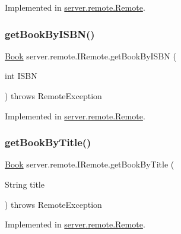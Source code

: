 Implemented in \hyperlink{classserver_1_1remote_1_1_remote_a3d41acc8ab7328be2082573542758f07}{server.\+remote.\+Remote}.

\mbox{\label{interfaceserver_1_1remote_1_1_i_remote_a736183bf7a57f78acf11fb78ae0f0e58}} 
\subsubsection{\texorpdfstring{get\+Book\+By\+I\+S\+B\+N()}{getBookByISBN()}}
{\footnotesize\ttfamily \hyperlink{classserver_1_1data_1_1_book}{Book} server.\+remote.\+I\+Remote.\+get\+Book\+By\+I\+S\+BN (\begin{DoxyParamCaption}\item[{int}]{I\+S\+BN }\end{DoxyParamCaption}) throws Remote\+Exception}



Implemented in \hyperlink{classserver_1_1remote_1_1_remote_a36ffc6f95ea75ad7d393ea296e1bc0cc}{server.\+remote.\+Remote}.

\mbox{\label{interfaceserver_1_1remote_1_1_i_remote_a520cc1af90d13264c14b32e19b5ce712}} 
\subsubsection{\texorpdfstring{get\+Book\+By\+Title()}{getBookByTitle()}}
{\footnotesize\ttfamily \hyperlink{classserver_1_1data_1_1_book}{Book} server.\+remote.\+I\+Remote.\+get\+Book\+By\+Title (\begin{DoxyParamCaption}\item[{String}]{title }\end{DoxyParamCaption}) throws Remote\+Exception}



Implemented in \hyperlink{classserver_1_1remote_1_1_remote_a560427fc017e15f04e12bd880e6f086e}{server.\+remote.\+Remote}.

